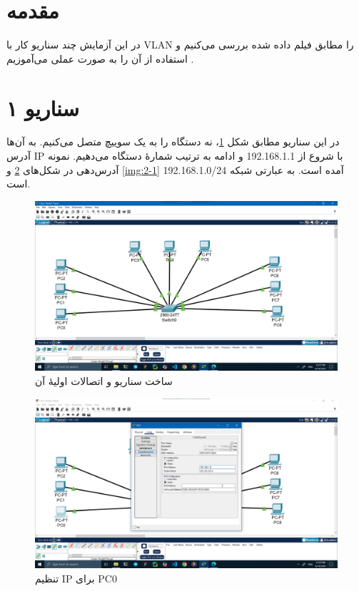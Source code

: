 \documentclass[12pt]{article}
\begin{document}
	\section{مقدمه}
	در این آزمایش چند سناریو کار با \textenglish{VLAN} را مطابق فیلم داده شده بررسی می‌کنیم و استفاده از آن را به صورت عملی می‌آموزیم \cite{a1}.
	
	\section{سناریو ۱}
	در این سناریو مطابق شکل \ref{img:1}، نه دستگاه را به یک سوییچ متصل می‌کنیم. به آن‌ها آدرس \textenglish{IP} با شروع از \textenglish{192.168.1.1} و ادامه به ترتیب شمارهٔ دستگاه می‌دهیم. نمونه آدرس‌دهی در شکل‌های \ref{img:2} و \ref{img:2-1} آمده است. به عبارتی شبکه \textenglish{192.168.1.0/24} است.
	\begin{figure}[H]
		\centering
		\includegraphics[width=\textwidth]{resources/1.png}
		\caption{ساخت سناریو  و اتصالات اولیهٔ آن}
		\label{img:1}
	\end{figure}
	\begin{figure}[H]
		\centering
		\includegraphics[width=\textwidth]{resources/2.png}
		\caption{تنظیم \textenglish{IP} برای \textenglish{PC0}}
		\label{img:2}
	\end{figure}
\end{document}
